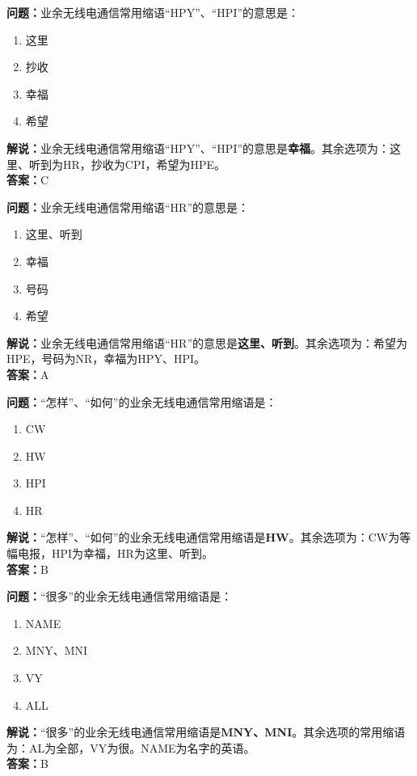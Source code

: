 \bigskip


\noindent\textbf{问题：}业余无线电通信常用缩语“HPY”、“HPI”的意思是：
\begin{enumerate}[label=\Alph*), leftmargin=3em]
\item 这里
\item 抄收
\item 幸福
\item 希望
\end{enumerate}
\noindent\textbf{解说：}业余无线电通信常用缩语“HPY”、“HPI”的意思是\textbf{幸福}。其余选项为：这里、听到为HR，抄收为CPI，希望为HPE。\\\noindent\textbf{答案：}C



\bigskip


\noindent\textbf{问题：}业余无线电通信常用缩语“HR”的意思是：
\begin{enumerate}[label=\Alph*), leftmargin=3em]
\item 这里、听到
\item 幸福
\item 号码
\item 希望
\end{enumerate}
\noindent\textbf{解说：}业余无线电通信常用缩语“HR”的意思是\textbf{这里、听到}。其余选项为：希望为HPE，号码为NR，幸福为HPY、HPI。\\\noindent\textbf{答案：}A


\bigskip


\noindent\textbf{问题：}“怎样”、“如何”的业余无线电通信常用缩语是：
\begin{enumerate}[label=\Alph*), leftmargin=3em]
\item CW
\item HW
\item HPI
\item HR
\end{enumerate}
\noindent\textbf{解说：}“怎样”、“如何”的业余无线电通信常用缩语是\textbf{HW}。其余选项为：CW为等幅电报，HPI为幸福，HR为这里、听到。\\\noindent\textbf{答案：}B



\bigskip


\noindent\textbf{问题：}“很多”的业余无线电通信常用缩语是：
\begin{enumerate}[label=\Alph*), leftmargin=3em]
\item NAME
\item MNY、MNI
\item VY
\item ALL
\end{enumerate}
\noindent\textbf{解说：}“很多”的业余无线电通信常用缩语是\textbf{MNY、MNI}。其余选项的常用缩语为：AL为全部，VY为很。NAME为名字的英语。\\\noindent\textbf{答案：}B



